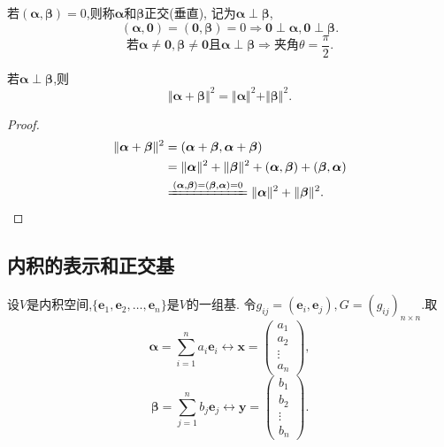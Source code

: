 \begin{definition}
  若$(\bm{\alpha},\bm{\beta})=0$,则称$\bm{\alpha}\text{和}\bm{\beta}$正交(垂直),
  记为$\bm{\alpha}\perp\bm{\beta}$,
  \[ (\bm{\alpha},\bm{0})=(\bm{0},\bm{\beta})=0 \Longrightarrow \bm{0}\perp \bm{\alpha}, \bm{0} \perp \bm{\beta}. \]
  \[ \text{若}\bm{\alpha}\neq \bm{0},\bm{\beta}\neq \bm{0}\text{且}
  \bm{\alpha}\perp\bm{\beta} \Longrightarrow \text{夹角}\theta = \frac{\pi}{2}. \]
\end{definition}

\begin{theorem}[勾股定理]
  若$\bm{\alpha}\perp\bm{\beta}$,则
  \[ \Vert\bm{\alpha}+\bm{\beta}\Vert^2=\Vert\bm{\alpha}\Vert^2+\Vert\bm{\beta}\Vert^2.  \]
\end{theorem}

\begin{proof}
  \begin{align*}
    \Vert\bm{\alpha}+\bm{\beta}\Vert^2 & = (\bm{\alpha}+\bm{\beta}, \bm{\alpha}+\bm{\beta})\\
                                       & = \Vert\bm{\alpha}\Vert^2+\Vert\bm{\beta}\Vert^2 + (\bm{\alpha},\bm{\beta})+(\bm{\beta},\bm{\alpha})\\
    & \xlongequal{(\bm{\alpha},\bm{\beta})=(\bm{\beta},\bm{\alpha})=0} \Vert\bm{\alpha}\Vert^2+\Vert\bm{\beta}\Vert^2.
  \end{align*}
\end{proof}

\subsection{内积的表示和正交基}

设$V$是内积空间,$\{\bm{e}_1, \bm{e}_2, \dots, \bm{e}_n\}$是$V$的一组基.
令$g_{ij}=(\bm{e}_i,\bm{e}_j), G=(g_{ij})_{n\times n}$.取
\[
  \bm{\alpha} = \sum_{i=1}^n a_i\bm{e}_i \longleftrightarrow \bm{x}= \begin{pmatrix}a_1\\a_2\\\vdots\\a_n\end{pmatrix},
  \]
\[
  \bm{\beta} = \sum_{j=1}^n b_j\bm{e}_j \longleftrightarrow \bm{y}= \begin{pmatrix}b_1\\b_2\\\vdots\\b_n\end{pmatrix}.
\]

